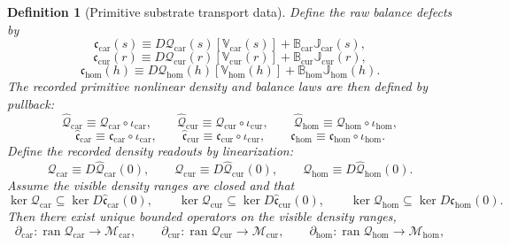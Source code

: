 \documentclass[11pt]{article}
\newcommand{\TensorDensity}{\mathcal Q_{\mathrm{car}}}
\newcommand{\CurDensity}{\mathcal Q_{\mathrm{cur}}}
\newcommand{\HomDensity}{\mathcal Q_{\mathrm{hom}}}
\newcommand{\TensorCont}{\partial_{\mathrm{car}}}
\newcommand{\CurCont}{\partial_{\mathrm{cur}}}
\newcommand{\HomCont}{\partial_{\mathrm{hom}}}
\newcommand{\TensorPrimitiveDensity}{\widehat{\mathcal Q}_{\mathrm{car}}}
\newcommand{\CurPrimitiveDensity}{\widehat{\mathcal Q}_{\mathrm{cur}}}
\newcommand{\HomPrimitiveDensity}{\widehat{\mathcal Q}_{\mathrm{hom}}}
\newcommand{\TensorBalance}{\widehat{\mathfrak c}_{\mathrm{car}}}
\newcommand{\CurBalance}{\widehat{\mathfrak c}_{\mathrm{cur}}}
\newcommand{\HomBalance}{\widehat{\mathfrak c}_{\mathrm{hom}}}
\newcommand{\TensorStateEmbed}{\iota_{\mathrm{car}}}
\newcommand{\CurStateEmbed}{\iota_{\mathrm{cur}}}
\newcommand{\HomStateEmbed}{\iota_{\mathrm{hom}}}
\newcommand{\TensorRawDensity}{\boldsymbol{\mathcal Q}_{\mathrm{car}}}
\newcommand{\CurRawDensity}{\boldsymbol{\mathcal Q}_{\mathrm{cur}}}
\newcommand{\HomRawDensity}{\boldsymbol{\mathcal Q}_{\mathrm{hom}}}
\newcommand{\TensorTransport}{\mathbb V_{\mathrm{car}}}
\newcommand{\CurTransport}{\mathbb V_{\mathrm{cur}}}
\newcommand{\HomTransport}{\mathbb V_{\mathrm{hom}}}
\newcommand{\TensorFlux}{\mathbb J_{\mathrm{car}}}
\newcommand{\CurFlux}{\mathbb J_{\mathrm{cur}}}
\newcommand{\HomFlux}{\mathbb J_{\mathrm{hom}}}
\newcommand{\TensorDiv}{\mathbb B_{\mathrm{car}}}
\newcommand{\CurDiv}{\mathbb B_{\mathrm{cur}}}
\newcommand{\HomDiv}{\mathbb B_{\mathrm{hom}}}
\newcommand{\TensorRawBalance}{\boldsymbol{\mathfrak c}_{\mathrm{car}}}
\newcommand{\CurRawBalance}{\boldsymbol{\mathfrak c}_{\mathrm{cur}}}
\newcommand{\HomRawBalance}{\boldsymbol{\mathfrak c}_{\mathrm{hom}}}
\newtheorem{definition}{Definition}
\begin{document}
\begin{definition}[Primitive substrate transport data]
Define the raw balance defects by
\begin{equation}
\TensorRawBalance(s)
\equiv
D\TensorRawDensity(s)[\TensorTransport(s)]
+\TensorDiv\TensorFlux(s),
\label{eq:raw_balance_car}
\end{equation}
\begin{equation}
\CurRawBalance(r)
\equiv
D\CurRawDensity(r)[\CurTransport(r)]
+\CurDiv\CurFlux(r),
\label{eq:raw_balance_cur}
\end{equation}
\begin{equation}
\HomRawBalance(h)
\equiv
D\HomRawDensity(h)[\HomTransport(h)]
+\HomDiv\HomFlux(h).
\label{eq:raw_balance_hom}
\end{equation}
The recorded primitive nonlinear density and balance laws are then defined by pullback:
\begin{equation}
\TensorPrimitiveDensity\equiv\TensorRawDensity\circ\TensorStateEmbed,\qquad
\CurPrimitiveDensity\equiv\CurRawDensity\circ\CurStateEmbed,\qquad
\HomPrimitiveDensity\equiv\HomRawDensity\circ\HomStateEmbed,
\label{eq:primitive_density_from_transport}
\end{equation}
\begin{equation}
\TensorBalance\equiv\TensorRawBalance\circ\TensorStateEmbed,\qquad
\CurBalance\equiv\CurRawBalance\circ\CurStateEmbed,\qquad
\HomBalance\equiv\HomRawBalance\circ\HomStateEmbed.
\label{eq:primitive_balance_from_transport}
\end{equation}
Define the recorded density readouts by linearization:
\begin{equation}
\TensorDensity\equiv D\TensorPrimitiveDensity(0),\qquad
\CurDensity\equiv D\CurPrimitiveDensity(0),\qquad
\HomDensity\equiv D\HomPrimitiveDensity(0).
\label{eq:density_from_transport}
\end{equation}
Assume the visible density ranges are closed and that
\begin{equation}
\ker\TensorDensity\subseteq\ker D\TensorBalance(0),\qquad
\ker\CurDensity\subseteq\ker D\CurBalance(0),\qquad
\ker\HomDensity\subseteq\ker D\HomBalance(0).
\label{eq:transport_kernel_factor}
\end{equation}
Then there exist unique bounded operators on the visible density ranges,
\begin{equation}
\TensorCont:\operatorname{ran}\TensorDensity\to\mathscr M_{\mathrm{car}},\qquad
\CurCont:\operatorname{ran}\CurDensity\to\mathscr M_{\mathrm{cur}},\qquad
\HomCont:\operatorname{ran}\HomDensity\to\mathscr M_{\mathrm{hom}},
\label{eq:transport_continuity}
\end{equation}

\end{definition}
\end{document}
